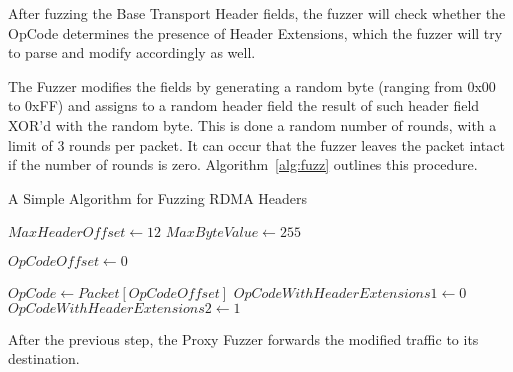 After fuzzing the Base Transport Header fields, the fuzzer will check whether the OpCode determines the presence of Header Extensions,
which the fuzzer will try to parse and modify accordingly as well.

The Fuzzer modifies the fields by generating a random byte (ranging from 0x00 to 0xFF) and
assigns to a random header field the result of such header field XOR'd with the random byte. This is done a random number
of rounds, with a limit of 3 rounds per packet. It can occur that the fuzzer leaves the packet intact if the number of rounds is zero.
Algorithm~\ref{alg:fuzz} outlines this procedure.

\SetAlgoVlined
\begin{algorithm}[t]
  \caption{A Simple Algorithm for Fuzzing RDMA Headers}
  \label{alg:fuzz}
  \LinesNumberedHidden
  \DontPrintSemicolon
  $MaxHeaderOffset \gets 12$\;
  $MaxByteValue \gets 255$\;

  $OpCodeOffset \gets 0$\;

  $OpCode \gets Packet[OpCodeOffset]$\;
  $OpCodeWithHeaderExtensions1 \gets 0$\;
  $OpCodeWithHeaderExtensions2 \gets 1$\;

\end{algorithm}

After the previous step, the Proxy Fuzzer forwards the modified traffic to its destination.



